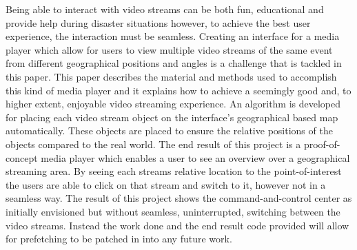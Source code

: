 Being able to interact with video streams can be both fun, educational and provide help during disaster situations however, to achieve the best user experience, the interaction must be seamless. Creating an interface for a media player which allow for users to view multiple video streams of the same event from different geographical positions and angles is a challenge that is tackled in this paper. This paper describes the material and methods used to accomplish this kind of media player and it explains how to achieve a seemingly good and, to higher extent, enjoyable video streaming experience. An algorithm is developed for placing each video stream object on the interface's geographical based map automatically. These objects are placed to ensure the relative positions of the objects compared to the real world. The end result of this project is a proof-of-concept media player which enables a user to see an overview over a geographical streaming area. By seeing each streams relative location to the point-of-interest the users are able to click on that stream and switch to it, however not in a seamless way. The result of this project shows the command-and-control center as initially envisioned but without seamless, uninterrupted, switching between the video streams. Instead the work done and the end result code provided will allow for prefetching to be patched in into any future work.